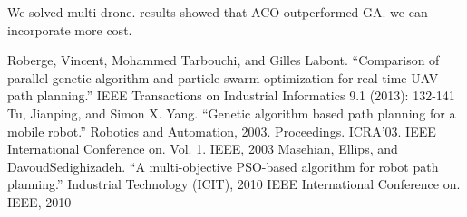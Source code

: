 \documentclass[conference]{IEEEtran}
\begin{document}
We solved multi drone. results showed that ACO outperformed GA. we can incorporate more cost.

\begin{thebibliography}{00}
 Roberge, Vincent, Mohammed Tarbouchi, and Gilles Labont. ``Comparison of parallel genetic algorithm and particle swarm optimization for real-time UAV path planning.'' IEEE Transactions on Industrial Informatics 9.1 (2013): 132-141
 Tu, Jianping, and Simon X. Yang. ``Genetic algorithm based path planning for a mobile robot.'' Robotics and Automation, 2003. Proceedings. ICRA'03. IEEE International Conference on. Vol. 1. IEEE, 2003
 Masehian, Ellips, and DavoudSedighizadeh. ``A multi-objective PSO-based algorithm for robot path planning.'' Industrial Technology (ICIT), 2010 IEEE International Conference on. IEEE, 2010
\end{thebibliography}
\end{document}
